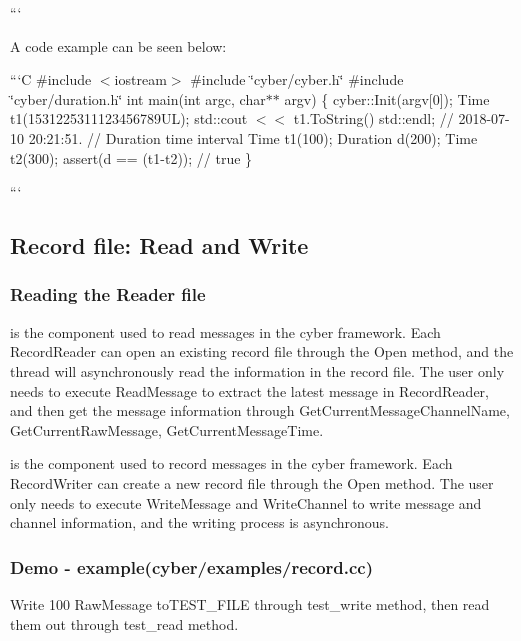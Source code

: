 {\ttfamily ```}

{\ttfamily A code example can be seen below\-:}

{\ttfamily ```\-C \#include $<$iostream$>$ \#include \char`\"{}cyber/cyber.\-h\char`\"{} \#include \char`\"{}cyber/duration.\-h\char`\"{} int main(int argc, char$\ast$$\ast$ argv) \{ cyber\-::\-Init(argv\mbox{[}0\mbox{]}); Time t1(1531225311123456789\-U\-L); std\-::cout $<$$<$ t1.\-To\-String() std\-::endl; // 2018-\/07-\/10 20\-:21\-:51. // Duration time interval Time t1(100); Duration d(200); Time t2(300); assert(d == (t1-\/t2)); // true \}}

{\ttfamily ```}

{\ttfamily \subsection*{Record file\-: Read and Write}}

{\ttfamily }

{\ttfamily \subsubsection*{Reading the Reader file}}

{\ttfamily }

{ is the component used to read messages in the cyber framework. Each Record\-Reader can open an existing record file through the {\ttfamily Open} method, and the thread will asynchronously read the information in the record file. The user only needs to execute Read\-Message to extract the latest message in Record\-Reader, and then get the message information through Get\-Current\-Message\-Channel\-Name, Get\-Current\-Raw\-Message, Get\-Current\-Message\-Time.}

{ is the component used to record messages in the cyber framework. Each Record\-Writer can create a new record file through the Open method. The user only needs to execute Write\-Message and Write\-Channel to write message and channel information, and the writing process is asynchronous.}

{\ttfamily \subsubsection*{Demo -\/ example(cyber/examples/record.\-cc)}}

{\ttfamily  Write 100 Raw\-Message to{\ttfamily T\-E\-S\-T\-\_\-\-F\-I\-L\-E} through {\ttfamily test\-\_\-write} method, then read them out through {\ttfamily test\-\_\-read} method.}

